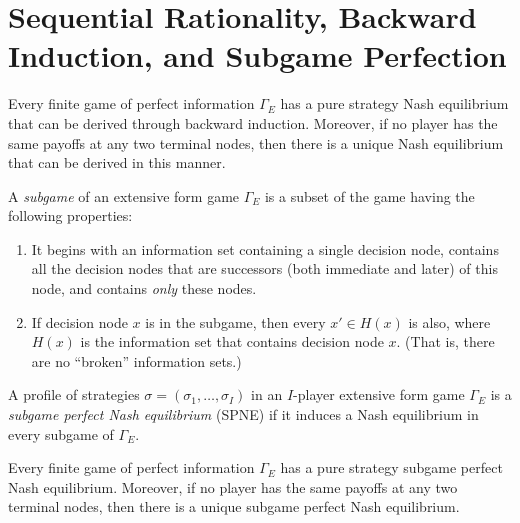 \addtocounter{section}{1}


\section{Sequential Rationality, Backward Induction, and Subgame Perfection}

\begin{prop}
    Every finite game of perfect information $\Gamma_E$ has a pure strategy Nash equilibrium that can be derived through backward induction. Moreover, if no player has the same payoffs at any two terminal nodes, then there is a unique Nash equilibrium that can be derived in this manner.
\end{prop}

\begin{defn}
    A \emph{subgame} of an extensive form game $\Gamma_E$ is a subset of the game having the following properties:
    \begin{enumerate}
        \item It begins with an information set containing a single decision node, contains all the decision nodes that are successors (both immediate and later) of this node, and contains \emph{only} these nodes.
        \item If decision node $x$ is in the subgame, then every $x' \in H(x)$ is also, where $H(x)$ is the information set that contains decision node $x$. (That is, there are no ``broken'' information sets.)
    \end{enumerate}
\end{defn}

\begin{defn}
    A profile of strategies $\sigma = (\sigma_1, \dots, \sigma_I)$ in an $I$-player extensive form game $\Gamma_E$ is a \emph{subgame perfect Nash equilibrium} (SPNE) if it induces a Nash equilibrium in every subgame of $\Gamma_E$.
\end{defn}

\begin{prop}
    Every finite game of perfect information $\Gamma_E$ has a pure strategy subgame perfect Nash equilibrium. Moreover, if no player has the same payoffs at any two terminal nodes, then there is a unique subgame perfect Nash equilibrium.
\end{prop}

